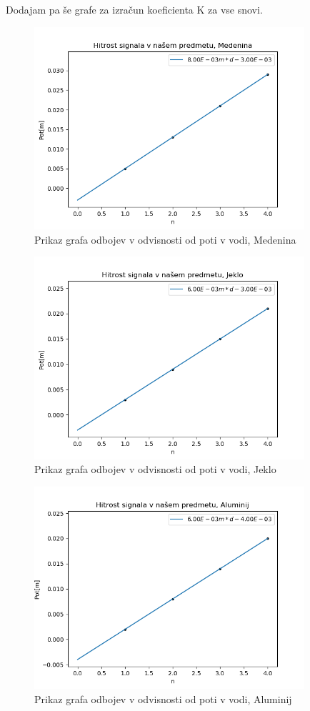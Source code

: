\documentclass[11pt, a4paper]{article}
\theoremstyle{definition}
\theoremstyle{example}
\theoremstyle{izrek}
\begin{document}
Dodajam pa še grafe za izračun koeficienta K za vse snovi. 
\begin{figure}[htp]
    \centering
    \includegraphics[width=10cm]{Medenina.png}
    \caption{Prikaz grafa odbojev v odvisnosti od poti v vodi, Medenina}
\end{figure}
\begin{figure}[htp]
    \centering
    \includegraphics[width=10cm]{Jeklo.png}
    \caption{Prikaz grafa odbojev v odvisnosti od poti v vodi, Jeklo}
\end{figure}
\begin{figure}[htp]
    \centering
    \includegraphics[width=10cm]{Aluminij.png}
    \caption{Prikaz grafa odbojev v odvisnosti od poti v vodi, Aluminij}
\end{figure}
\end{document}
